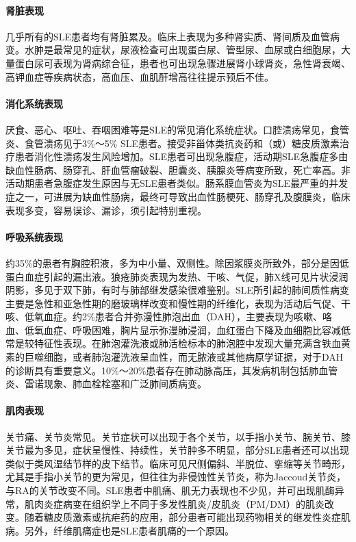 \paragraph{肾脏表现}

几乎所有的SLE患者均有肾脏累及。临床上表现为多种肾实质、肾间质及血管病变。水肿是最常见的症状，尿液检查可出现蛋白尿、管型尿、血尿或白细胞尿，大量蛋白尿可表现为肾病综合征，患者也可出现急骤进展肾小球肾炎，急性肾衰竭、高钾血症等疾病状态，高血压、血肌酐增高往往提示预后不佳。

\paragraph{消化系统表现}

厌食、恶心、呕吐、吞咽困难等是SLE的常见消化系统症状。口腔溃疡常见，食管炎、食管溃疡见于3\%～5\%
SLE患者。接受非甾体类抗炎药和（或）糖皮质激素治疗患者消化性溃疡发生风险增加。SLE患者可出现急腹症，活动期SLE急腹症多由缺血性肠病、肠穿孔、肝血管瘤破裂、胆囊炎、胰腺炎等病变所致，死亡率高。非活动期患者急腹症发生原因与无SLE患者类似。肠系膜血管炎为SLE最严重的并发症之一，可进展为缺血性肠病，最终可导致出血性肠梗死、肠穿孔及腹膜炎，临床表现多变，容易误诊、漏诊，须引起特别重视。

\paragraph{呼吸系统表现}

约35\%的患者有胸腔积液，多为中小量、双侧性。除因浆膜炎所致外，部分是因低蛋白血症引起的漏出液。狼疮肺炎表现为发热、干咳、气促，肺X线可见片状浸润阴影，多见于双下肺，有时与肺部继发感染很难鉴别。SLE所引起的肺间质性病变主要是急性和亚急性期的磨玻璃样改变和慢性期的纤维化，表现为活动后气促、干咳、低氧血症。约2\%患者合并弥漫性肺泡出血（DAH），主要表现为咳嗽、咯血、低氧血症、呼吸困难，胸片显示弥漫肺浸润，血红蛋白下降及血细胞比容减低常是较特征性表现。在肺泡灌洗液或肺活检标本的肺泡腔中发现大量充满含铁血黄素的巨噬细胞，或者肺泡灌洗液呈血性，而无脓液或其他病原学证据，对于DAH的诊断具有重要意义。10\%～20\%患者存在肺动脉高压，其发病机制包括肺血管炎、雷诺现象、肺血栓栓塞和广泛肺间质病变。

\paragraph{肌肉表现}

关节痛、关节炎常见。关节症状可以出现于各个关节，以手指小关节、腕关节、膝关节最为多见，症状呈慢性、持续性，关节肿多不明显，部分SLE患者还可以出现类似于类风湿结节样的皮下结节。临床可见尺侧偏斜、半脱位、挛缩等关节畸形，尤其是手指小关节的更为常见，但往往为非侵蚀性关节炎，称为Jaccoud关节炎，与RA的关节改变不同。SLE患者中肌痛、肌无力表现也不少见，并可出现肌酶异常，肌肉炎症病变在组织学上不同于多发性肌炎/皮肌炎（PM/DM）的肌炎改变。随着糖皮质激素或抗疟药的应用，部分患者可能出现药物相关的继发性炎症肌病。另外，纤维肌痛症也是SLE患者肌痛的一个原因。

